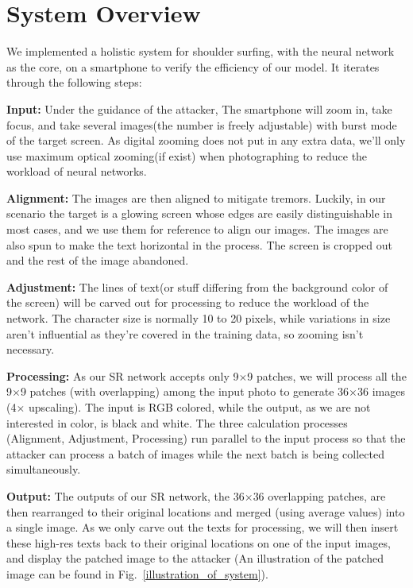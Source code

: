 \section{System Overview}
\label{sec-system-overview} 
We implemented a holistic system for shoulder surfing, with the neural network as the core, on a smartphone to verify the efficiency of our model. It iterates through the following steps: 

\vspace{1mm}
\noindent
\textbf{Input:} Under the guidance of the attacker, The smartphone will zoom in, take focus, and take several images(the number is freely adjustable) with burst mode of the target screen. As digital zooming does not put in any extra data, we'll only use maximum optical zooming(if exist) when photographing to reduce the workload of neural networks.

\vspace{1mm}
\noindent
\textbf{Alignment:} The images are then aligned to mitigate tremors. Luckily, in our scenario the target is a glowing screen whose edges are easily distinguishable in most cases, and we use them for reference to align our images. The images are also spun to make the text horizontal in the process. The screen is cropped out and the rest of the image abandoned.


\vspace{1mm}
\noindent
\textbf{Adjustment:} The lines of text(or stuff differing from the background color of the screen) will be carved out for processing to reduce the workload of the network. The character size is normally 10 to 20 pixels, while variations in size aren't influential as they're covered in the training data, so zooming isn't necessary.

\vspace{1mm}
\noindent
\textbf{Processing:} As our SR network accepts only 9$\times$9 patches, we will process all the 9$\times$9 patches (with overlapping) among the input photo to generate 36$\times$36 images (4$\times$ upscaling). The input is RGB colored, while the output, as we are not interested in color, is black and white. The three calculation processes (Alignment, Adjustment, Processing) run parallel to the input process so that the attacker can process a batch of images while the next batch is being collected simultaneously.
		
\vspace{1mm}
\noindent
\textbf{Output:} The outputs of our SR network, the 36$\times$36 overlapping patches, are then rearranged to their original locations and merged (using average values) into a single image. As we only carve out the texts for processing, we will then insert these high-res texts back to their original locations on one of the input images, and display the patched image to the attacker (An illustration of the patched image can be found in Fig.~\ref{illustration_of_system}).


